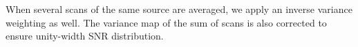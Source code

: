 

When several scans of the same source are averaged, we apply an inverse
variance weighting as well. %
The variance map of the sum of scans is also corrected to ensure unity-width
SNR distribution.




